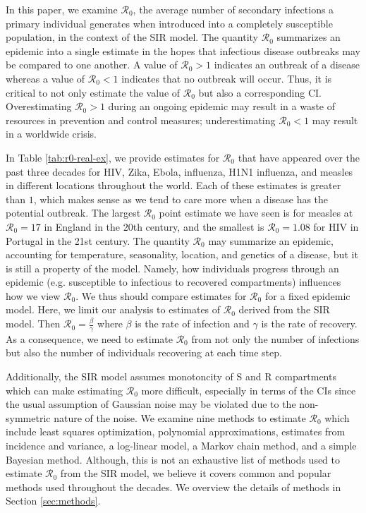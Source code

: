 \documentclass[12pt]{article}
\newcommand{\wxxsir}{nine } %
\newcommand{\rr}{\ensuremath{\mathcal{R}_0}}
\begin{document}
In this paper, we examine $\rr$, the average number of secondary infections a primary individual generates when introduced into a completely susceptible population, in the context of the SIR model.  The quantity $\rr$ summarizes an epidemic into a single estimate in the hopes that infectious disease outbreaks may be compared to one another.  A value of $\rr > 1$ indicates an outbreak of a disease whereas a value of $\rr < 1$ indicates that no outbreak will occur.  Thus, it is critical to not only estimate the value of $\rr$ but also a corresponding CI.  Overestimating $\rr > 1$ during an ongoing epidemic may result in a waste of resources in prevention and control measures; underestimating $\rr < 1$ may result in a worldwide crisis.

In Table \ref{tab:r0-real-ex}, we provide estimates for $\rr$ that have appeared over the past three decades for HIV, Zika, Ebola, influenza, H1N1 influenza, and measles in different locations throughout the world.  Each of these estimates is greater than $1$, which makes sense as we tend to care more when a disease has the potential outbreak.  The largest $\rr$ point estimate we have seen is for measles at $\rr=17$ in England in the 20th century, and the smallest is $\rr=1.08$ for HIV in Portugal in the 21st century.
The quantity $\rr$ may summarize an epidemic, accounting for temperature, seasonality, location, and genetics of a disease, but it is still a property of the model.  Namely, how individuals progress through an epidemic (e.g. susceptible to infectious to recovered compartments) influences how we view $\rr$.  We thus should compare estimates for $\rr$ for a fixed epidemic model.  Here, we limit our analysis to estimates of $\rr$ derived from the SIR model.  Then $\rr = \frac{\beta}{\gamma}$ where $\beta$ is the rate of infection and $\gamma$ is the rate of recovery.  As a consequence, we need to estimate $\rr$ from not only the number of infections but also the number of individuals recovering at each time step.


Additionally, the SIR model assumes monotoncity of S and R compartments which can make estimating $\rr$ more difficult, especially in terms of the CIs since the usual assumption of Gaussian noise may be violated due to the non-symmetric nature of the noise.  We examine \wxxsir methods to estimate $\rr$ which include least squares optimization, polynomial approximations, estimates from incidence and variance, a log-linear model, a Markov chain method, and a simple Bayesian method.  Although, this is not an exhaustive list of methods used to estimate $\rr$ from the SIR model, we believe it covers common and popular methods used throughout the decades.  We overview the details of methods in Section \ref{sec:methods}.
\end{document}
